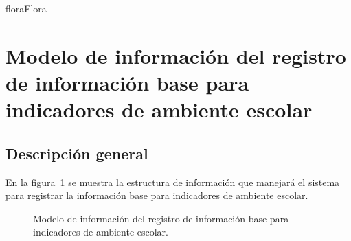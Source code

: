 \begin{BusinessEntity}{flora}{Flora}
\end{BusinessEntity}

\section{Modelo de información del registro de información base para indicadores de ambiente escolar}

\subsection{Descripción general}
 En la figura~\ref{fig:registroInfoBaseAmbiente} se muestra la estructura de información que manejará el sistema para registrar la información base para indicadores de ambiente escolar.
 
\begin{figure}[htbp!]
	\begin{center}
		\caption{Modelo de información del registro de información base para indicadores de ambiente escolar.}
		\label{fig:registroInfoBaseAmbiente}
	\end{center}
\end{figure}


